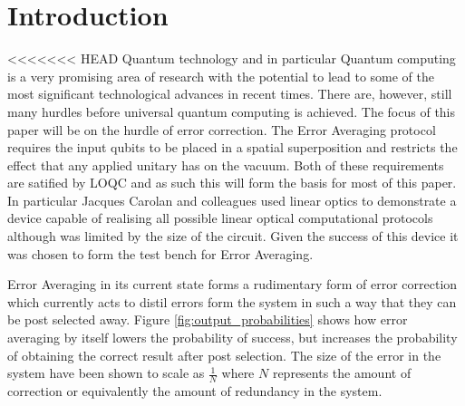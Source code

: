\documentclass[aps,pra,twocolumn,superscriptaddress,numerical]{revtex4-1}
\begin{document}
\pacs{}

\maketitle

\section{Introduction \label{intro}}
<<<<<<< HEAD
	Quantum technology and in particular Quantum computing is a very promising area of research with the potential to lead to some of the most significant technological advances in recent times. There are, however, still many hurdles before universal quantum computing is achieved. The focus of this paper will be on the hurdle of error correction. The Error Averaging protocol requires the input qubits to be placed in a spatial superposition and restricts the effect that any applied unitary has on the vacuum. Both of these requirements are satified by LOQC and as such this will form the basis for most of this paper. In particular Jacques Carolan and colleagues \cite{ULO} used linear optics to demonstrate a device capable of realising all possible linear optical computational protocols although was limited by the size of the circuit. Given the success of this device it was chosen to form the test bench for Error Averaging.
			
	Error Averaging in its current state forms a rudimentary form of error correction which currently acts to distil errors form the system in such a way that they can be post selected away. Figure \ref{fig:output_probabilities} shows how error averaging by itself lowers the probability of success, but increases the probability of obtaining the correct result after post selection. The size of the error in the system have been shown to scale as $\frac{1}{N}$ where $N$ represents the amount of correction or equivalently the amount of redundancy in the system.
	
\end{document}
